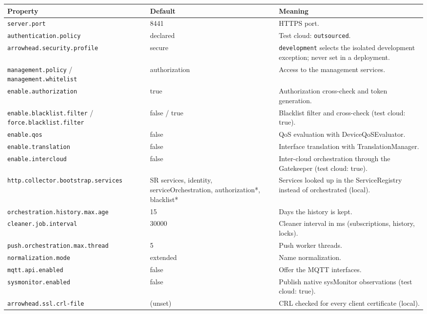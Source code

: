 \documentclass[a4paper]{arrowhead}
\begin{document}
\noindent\begin{longtable}{| p{5.4cm} | p{3.4cm} | p{6.4cm} |} \hline
\rowcolor{gray!33} Property & Default & Meaning \\ \hline \endhead
\texttt{server.\allowbreak{}port} & 8441 & HTTPS port. \\ \hline
\texttt{authentication.\allowbreak{}policy} & declared & Test cloud: \texttt{outsourced}. \\ \hline
\texttt{arrowhead.\allowbreak{}security.\allowbreak{}profile} & secure & \texttt{development} selects the isolated development exception; never set in a deployment. \\ \hline
\texttt{management.\allowbreak{}policy} / \texttt{management.\allowbreak{}whitelist} & authorization & Access to the management services. \\ \hline
\texttt{enable.\allowbreak{}authorization} & true & Authorization cross-check and token generation. \\ \hline
\texttt{enable.\allowbreak{}blacklist.\allowbreak{}filter} / \texttt{force.\allowbreak{}blacklist.\allowbreak{}filter} & false / true & Blacklist filter and cross-check (test cloud: true). \\ \hline
\texttt{enable.\allowbreak{}qos} & false & QoS evaluation with Device\allowbreak{}Qo\allowbreak{}SEvaluator. \\ \hline
\texttt{enable.\allowbreak{}translation} & false & Interface translation with Translation\allowbreak{}Manager. \\ \hline
\texttt{enable.\allowbreak{}intercloud} & false & Inter-cloud orchestration through the Gatekeeper (test cloud: true). \\ \hline
\texttt{http.\allowbreak{}collector.\allowbreak{}bootstrap.\allowbreak{}services} & SR services, identity, service\allowbreak{}Orchestration, authorization*, blacklist* & Services looked up in the ServiceRegistry instead of orchestrated (local). \\ \hline
\texttt{orchestration.\allowbreak{}history.\allowbreak{}max.\allowbreak{}age} & 15 & Days the history is kept. \\ \hline
\texttt{cleaner.\allowbreak{}job.\allowbreak{}interval} & 30000 & Cleaner interval in ms (subscriptions, history, locks). \\ \hline
\texttt{push.\allowbreak{}orchestration.\allowbreak{}max.\allowbreak{}thread} & 5 & Push worker threads. \\ \hline
\texttt{normalization.\allowbreak{}mode} & extended & Name normalization. \\ \hline
\texttt{mqtt.\allowbreak{}api.\allowbreak{}enabled} & false & Offer the MQTT interfaces. \\ \hline
\texttt{sysmonitor.\allowbreak{}enabled} & false & Publish native sysMonitor observations (test cloud: true). \\ \hline
\texttt{arrowhead.\allowbreak{}ssl.\allowbreak{}crl-\allowbreak{}file} & (unset) & CRL checked for every client certificate (local). \\ \hline
\end{longtable}
\end{document}
